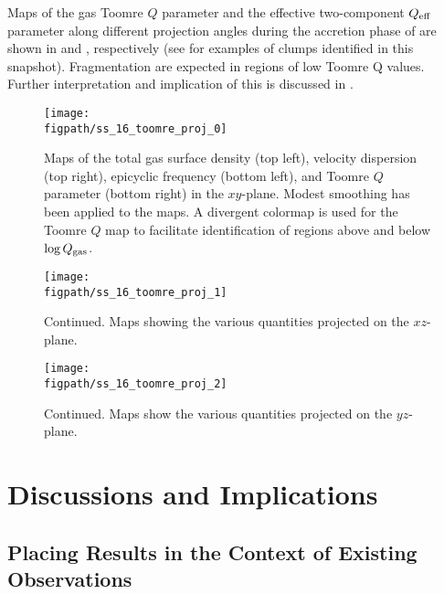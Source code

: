\IfFileExists{emulateapjlegacy.cls}{\documentclass[iop]{emulateapjlegacy}}{\documentclass[iop]{emulateapj}}
\begin{document}
Maps of the gas Toomre $Q$ parameter and the effective two-component $Q_{\rm eff}$ parameter along different projection angles during the accretion phase of \flower are shown in  and , respectively (see  for examples of clumps identified 
in this snapshot). Fragmentation are expected in regions of low Toomre Q values.
Further interpretation and implication of this is discussed in .


\begin{figure*}[htbp]
\centering
\texttt{[image: \\figpath/ss\_16\_toomre\_proj\_0]}
\caption{
Maps of the total gas surface density (top left), 
velocity dispersion (top right),
epicyclic frequency (bottom left), 
and Toomre $Q$ parameter (bottom right) in the $xy$-plane.
Modest smoothing has been applied to the maps. 
A divergent colormap is used for the Toomre $Q$ map to facilitate 
identification of regions above and below $\log{Q_{\rm gas}}$.
\label{fig:Q}}
\addtocounter{figure}{-1}
\end{figure*}

\begin{figure*}[htbp]
\centering
\texttt{[image: \\figpath/ss\_16\_toomre\_proj\_1]}
\caption{Continued. Maps showing the various quantities projected on the $xz$-plane.}
\addtocounter{figure}{-1}
\end{figure*}

\begin{figure*}[htbp]
\centering
\texttt{[image: \\figpath/ss\_16\_toomre\_proj\_2]}
\caption{Continued. Maps show the various quantities projected on the $yz$-plane.}
\end{figure*}





\section{Discussions and Implications}     \label{sec:diss}

\subsection{Placing Results in the Context of Existing Observations} \label{sec:diss1}
\end{document}

